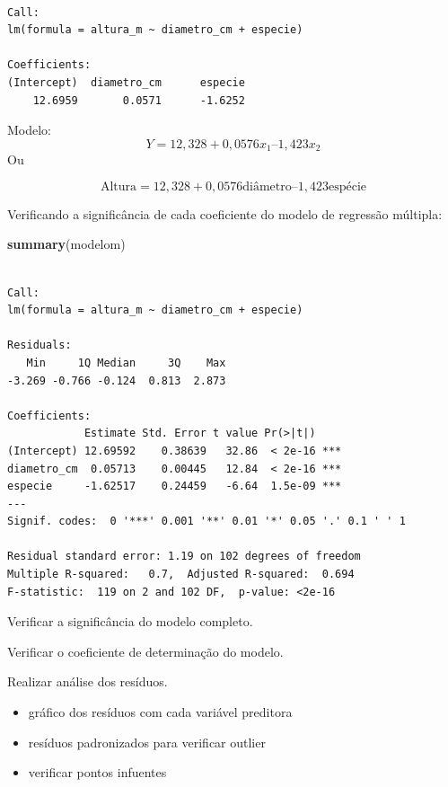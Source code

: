 \documentclass[12pt,brazil,oneside]{book}
\newenvironment{Shaded}{\begin{snugshade}}{\end{snugshade}}
\newcommand{\KeywordTok}[1]{\textcolor[rgb]{0.13,0.29,0.53}{\textbf{#1}}}
\newcommand{\NormalTok}[1]{#1}
\providecommand{\tightlist}{%
  \setlength{\itemsep}{0pt}\setlength{\parskip}{0pt}}
\begin{document}
\begin{verbatim}

Call:
lm(formula = altura_m ~ diametro_cm + especie)

Coefficients:
(Intercept)  diametro_cm      especie  
    12.6959       0.0571      -1.6252  
\end{verbatim}

Modelo:
\[
Y = 12,328 + 0,0576 x_1 – 1,423 x_2
\]
Ou

\[
\text{Altura} = 12,328 + 0,0576\text{diâmetro} – 1,423\text{espécie}
\]

Verificando a significância de cada coeficiente do modelo de regressão múltipla:

\begin{Shaded}
\begin{Highlighting}[]
\KeywordTok{summary}\NormalTok{(modelom)}
\end{Highlighting}
\end{Shaded}

\begin{verbatim}

Call:
lm(formula = altura_m ~ diametro_cm + especie)

Residuals:
   Min     1Q Median     3Q    Max 
-3.269 -0.766 -0.124  0.813  2.873 

Coefficients:
            Estimate Std. Error t value Pr(>|t|)    
(Intercept) 12.69592    0.38639   32.86  < 2e-16 ***
diametro_cm  0.05713    0.00445   12.84  < 2e-16 ***
especie     -1.62517    0.24459   -6.64  1.5e-09 ***
---
Signif. codes:  0 '***' 0.001 '**' 0.01 '*' 0.05 '.' 0.1 ' ' 1

Residual standard error: 1.19 on 102 degrees of freedom
Multiple R-squared:   0.7,  Adjusted R-squared:  0.694 
F-statistic:  119 on 2 and 102 DF,  p-value: <2e-16
\end{verbatim}

Verificar a significância do modelo completo.

Verificar o coeficiente de determinação do modelo.

Realizar análise dos resíduos.

\begin{itemize}
\tightlist
\item
  gráfico dos resíduos com cada variável preditora
\item
  resíduos padronizados para verificar outlier
\item
  verificar pontos infuentes
\end{itemize}
\end{document}
